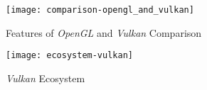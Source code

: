 \begin{figure}[t]
	\begin{center}
		\texttt{[image: comparison-opengl\_and\_vulkan]}
		\caption{Features of \emph{OpenGL} and \emph{Vulkan} Comparison}
		\label{fig:comparison_opengl_vulkan}
	\end{center}
\end{figure}
\begin{figure}[t]
	\begin{center}
		\texttt{[image: ecosystem-vulkan]}
		\caption{\emph{Vulkan} Ecosystem}
		\label{fig:vulkan_ecosystem}
	\end{center}
\end{figure}
